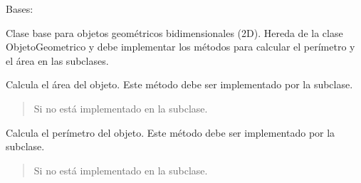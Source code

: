 \documentclass[letterpaper,10pt,spanish]{sphinxmanual}
\begin{document}

\begin{fulllineitems}
\label{\detokenize{pr8:pr8.4.Objeto2D}}
\pysigstartsignatures
{}
\pysigstopsignatures
\sphinxAtStartPar
Bases: {\hyperref[\detokenize{pr8:pr8.4.ObjetoGeometrico}]{}}

\sphinxAtStartPar
Clase base para objetos geométricos bidimensionales (2D).
Hereda de la clase ObjetoGeometrico y debe implementar los métodos
para calcular el perímetro y el área en las subclases.

\begin{fulllineitems}
\label{\detokenize{pr8:pr8.4.Objeto2D.area}}
\pysigstartsignatures
{}
\pysigstopsignatures
\sphinxAtStartPar
Calcula el área del objeto. Este método debe ser implementado por la subclase.
\begin{quote}\begin{description}
\sphinxAtStartPar
{} \textendash{} Si no está implementado en la subclase.

\end{description}\end{quote}

\end{fulllineitems}


\begin{fulllineitems}
\label{\detokenize{pr8:pr8.4.Objeto2D.perimetro}}
\pysigstartsignatures
{}
\pysigstopsignatures
\sphinxAtStartPar
Calcula el perímetro del objeto. Este método debe ser implementado por la subclase.
\begin{quote}\begin{description}
\sphinxAtStartPar
{} \textendash{} Si no está implementado en la subclase.

\end{description}\end{quote}

\end{fulllineitems}


\end{fulllineitems}
\end{document}
